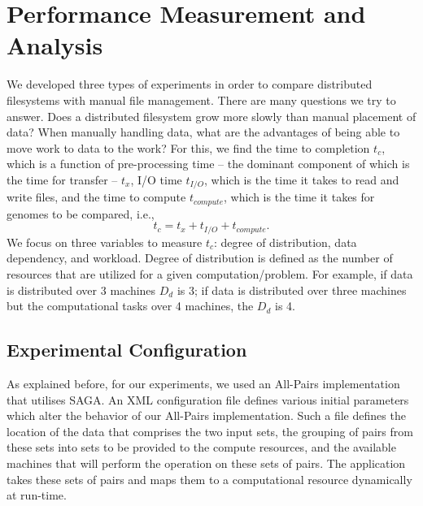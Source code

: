 \documentclass{rspublic}
\begin{document}
\section{Performance Measurement and Analysis} We developed three types
of experiments in order to compare distributed filesystems with manual
file management. There are many questions we try to answer.  Does a
distributed filesystem grow more slowly than manual placement of data?
When manually handling data, what are the advantages of being able to
move work to data to the work? For this, we find the time to completion
$t_c$, which is a function of pre-processing time -- the dominant
component of which is the time for transfer -- $t_x$, I/O time
$t_{I/O}$, which is the time it takes to read and write files, and the
time to compute $t_{compute}$, which is the time it takes for genomes to
be compared, i.e.,
 \begin{equation}
t_c = t_x + t_{I/O} + t_{compute}.
\end{equation}
We focus on three variables to measure $t_c$: degree of distribution,
data dependency, and workload. Degree of distribution is defined as
the number of resources that are utilized for a given
computation/problem. For example, if data is distributed over 3
machines $D_d$ is 3; if data is distributed over three machines but
the computational tasks over 4 machines, the $D_d$ is 4.

\subsection{Experimental Configuration}

As explained before, for our experiments, we used an All-Pairs
implementation that utilises SAGA. An XML configuration file defines
various initial parameters which alter the behavior of our All-Pairs
implementation.  Such a file defines the location of the data that
comprises the two input sets, the grouping of pairs from these sets into
sets to be provided to the compute resources, and the available machines
that will perform the operation on these sets of pairs. The application
takes these sets of pairs and maps them to a computational resource
dynamically at run-time.  
\end{document}

